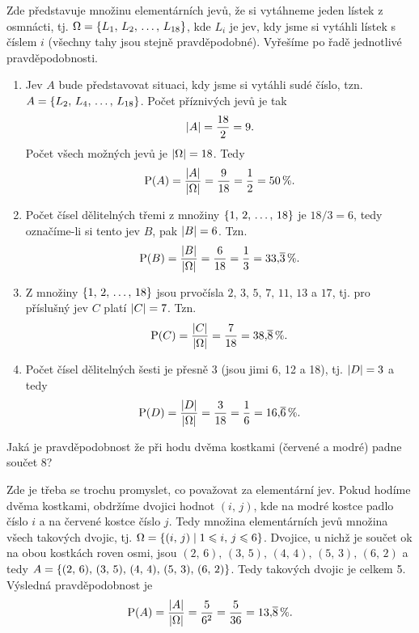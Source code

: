 \begin{solution}
    Zde představuje množinu elementárních jevů, že si vytáhneme jeden lístek z osmnácti, tj. $\Omega=\left\{L_1,\,L_2,\,\dots,\,L_{18}\right\}$, kde $L_i$ je jev, kdy jsme si vytáhli lístek s číslem $i$ (všechny tahy jsou stejně pravděpodobné). Vyřešíme po řadě jednotlivé pravděpodobnosti.\par
    \begin{enumerate}[label=(\alph*)]
        \item Jev $A$ bude představovat situaci, kdy jsme si vytáhli sudé číslo, tzn. $A=\left\{L_2,\,L_4,\,\dots,\,L_{18}\right\}$. Počet příznivých jevů je tak
        \[\left| A \right|=\dfrac{18}{2}=9.\]
        Počet všech možných jevů je $\left| \Omega \right|=18$. Tedy
        \[\operatorname{\text{P}}(A)=\dfrac{\left| A \right|}{\left| \Omega \right|}=\dfrac{9}{18}=\dfrac{1}{2}=50\,\%.\]
        \item Počet čísel dělitelných třemi z množiny $\left\{1,\,2,\,\dots,\,18\right\}$ je $18/3=6$, tedy označíme-li si tento jev $B$, pak $\left| B \right|=6$. Tzn.
        \[\operatorname{\text{P}}(B)=\dfrac{\left| B \right|}{\left| \Omega \right|}=\dfrac{6}{18}=\dfrac{1}{3}=33{,}\overline{3}\,\%.\]
        \item Z množiny $\left\{1,\,2,\,\dots,\,18\right\}$ jsou prvočísla $2,\,3,\,5,\,7,\,11,\,13$ a $17$, tj. pro příslušný jev $C$ platí $\left| C \right|=7$. Tzn.
        \[\operatorname{\text{P}}(C)=\dfrac{\left| C \right|}{\left| \Omega \right|}=\dfrac{7}{18}=38{,}\overline{8}\,\%.\]
        \item Počet čísel dělitelných šesti je přesně 3 (jsou jimi 6, 12 a 18), tj. $\left| D \right|=3$ a tedy
        \[\operatorname{\text{P}}(D)=\dfrac{\left| D \right|}{\left| \Omega \right|}=\dfrac{3}{18}=\dfrac{1}{6}=16{,}\overline{6}\,\%.\]
    \end{enumerate}
\end{solution}
\begin{task}
    Jaká je pravděpodobnost že při hodu dvěma kostkami (červené a modré) padne součet 8? \citep[sekce \emph{Pravděpodobnost a statistika}]{prikladyeu2022}
\end{task}
\begin{solution}
    Zde je třeba se trochu promyslet, co považovat za elementární jev. Pokud hodíme dvěma kostkami, obdržíme dvojici hodnot $(i,\,j)$, kde na modré kostce padlo číslo $i$ a na červené kostce číslo $j$. Tedy množina elementárních jevů množina všech takových dvojic, tj. $\Omega=\left\{(i,\,j) \;\middle\vert\; 1 \leqslant i,\,j \leqslant 6\right\}$. Dvojice, u nichž je součet ok na obou kostkách roven osmi, jsou $(2,\,6),\,(3,\,5),\,(4,\,4),\,(5,\,3),\,(6,\,2)$ a tedy $A=\left\{(2,\,6),\,(3,\,5),\,(4,\,4),\,(5,\,3),\,(6,\,2)\right\}$. Tedy takových dvojic je celkem 5. Výsledná pravděpodobnost je
    \[\operatorname{\text{P}}(A)=\dfrac{\left| A \right|}{\left| \Omega \right|}=\dfrac{5}{6^2}=\dfrac{5}{36}=13{,}\overline{8}\,\%.\]
\end{solution}
